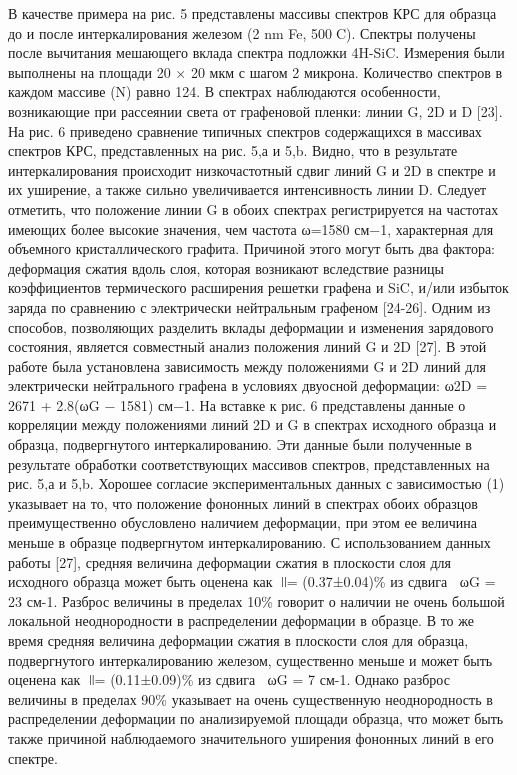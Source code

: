 В качестве примера на рис. 5 представлены массивы спектров КРС для образца до и после интеркалирования железом (2 nm Fe, 500C). Спектры получены после вычитания мешающего вклада спектра подложки 4H-SiC. Измерения были выполнены на площади 20 × 20 мкм с шагом 2 микрона. Количество спектров в каждом массиве (N) равно 124. В спектрах наблюдаются особенности, возникающие при рассеянии света от графеновой пленки: линии G, 2D и D [23]. На рис. 6 приведено сравнение типичных спектров содержащихся в массивах спектров КРС, представленных на рис. 5,а и 5,b. Видно, что в результате интеркалирования происходит низкочастотный сдвиг линий G и 2D в спектре и их уширение, а также сильно увеличивается интенсивность линии D. Следует отметить, что положение линии G в обоих спектрах регистрируется на частотах имеющих более высокие значения, чем частота ω=1580 см−1, характерная для объемного кристаллического графита. Причиной этого могут быть два фактора: деформация сжатия вдоль слоя, которая возникают вследствие разницы коэффициентов термического расширения решетки графена и SiC, и/или избыток заряда по сравнению с электрически нейтральным графеном [24-26]. Одним из способов, позволяющих разделить вклады деформации и изменения зарядового состояния, является совместный анализ положения линий G и 2D [27]. В этой работе была установлена зависимость между положениями G и 2D линий для электрически нейтрального графена в условиях двуосной деформации: 
ω2D = 2671 + 2.8(ωG − 1581) см−1.                              %
На вставке к рис. 6 представлены данные о корреляции между положениями линий 2D и G в спектрах исходного образца и образца, подвергнутого интеркалированию. Эти данные были полученные в результате обработки соответствующих массивов спектров, представленных на рис. 5,а и 5,b. Хорошее согласие экспериментальных данных с зависимостью (1) указывает на то, что положение фононных линий в спектрах обоих образцов преимущественно обусловлено наличием деформации, при этом ее величина меньше в образце подвергнутом интеркалированию.
С использованием данных работы [27], средняя величина деформации сжатия в плоскости слоя для исходного образца может быть оценена как ǀǀ= (0.37±0.04)\% из сдвига ωG = 23 см-1. Разброс величины в пределах 10\% говорит о наличии не очень большой локальной неоднородности в распределении деформации в образце. В то же время средняя величина деформации сжатия в плоскости слоя для образца, подвергнутого интеркалированию железом, существенно меньше и может быть оценена как ǀǀ= (0.11±0.09)\% из сдвига ωG = 7 см-1. Однако разброс величины в пределах 90\% указывает на очень существенную неоднородность в распределении деформации по анализируемой площади образца, что может быть также причиной наблюдаемого значительного уширения фононных линий в его спектре. 
